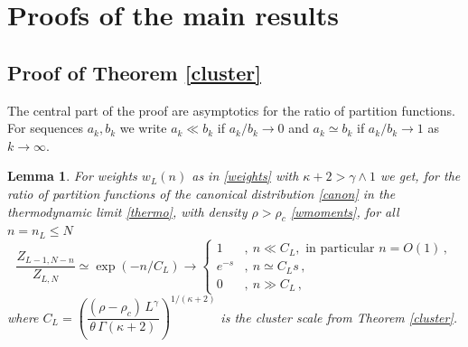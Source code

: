 \documentclass[pdflatex,sn-mathphys-num]{sn-jnl}%
\theoremstyle{thmstyleone}%
\newtheorem{lemma}[theorem]{Lemma}%
\theoremstyle{thmstyletwo}%
\theoremstyle{thmstylethree}%
\begin{document}
\section{Proofs of the main results}\label{sec_proof}

\subsection{Proof of Theorem \ref{cluster}}

The central part of the proof are asymptotics for the ratio of partition functions.
For sequences $a_k ,b_k$ we write $a_k \ll b_k$ if $a_k /b_k \to 0$ and $a_k \simeq b_k$ if $a_k /b_k \to 1$ as $k\to\infty$.
\vspace*{-3mm}
\begin{lemma}
	\label{corollary_quotients}
	For weights $w_L(n)$ as in \eqref{weights} with $\kappa +2>\gamma \wedge 1$ we get, for the ratio of partition functions of the canonical distribution \eqref{canon} in the thermodynamic limit \eqref{thermo}, with density $\rho > \rho_c$ \eqref{wmoments}, for all $n=n_L \leq N$
	\begin{equation*}
		\frac{Z_{L-1, N - n}}{Z_{L,N}} \simeq \exp(-n/C_L)\to \begin{cases}
			1&,\ n\ll C_L ,\mbox{ in particular }n=O(1)\,,\\
			e^{-s} &,\ n\simeq C_L s\,, \\
			0 &,\ n\gg C_L\,,
		\end{cases}
	\end{equation*}
	where $C_L = \left(\dfrac{(\rho - \rho_c) \, L^\gamma}{\theta \, \Gamma(\kappa +2)}\right)^{1/(\kappa +2)}$ is the cluster scale from Theorem \ref{cluster}.
\end{lemma}
\end{document}

